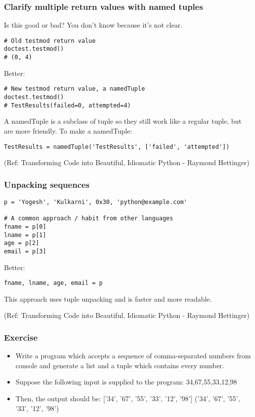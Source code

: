 \begin{frame}[fragile]\frametitle{Clarify multiple return values with named tuples}
Is this good or bad? You don't know because it's not clear.
\begin{lstlisting}
# Old testmod return value
doctest.testmod()
# (0, 4)
\end{lstlisting}
Better:
\begin{lstlisting}
# New testmod return value, a namedTuple
doctest.testmod()
# TestResults(failed=0, attempted=4)
\end{lstlisting}

A namedTuple is a subclass of tuple so they still work like a regular tuple, but are more friendly. To make a namedTuple:
\begin{lstlisting}
TestResults = namedTuple('TestResults', ['failed', 'attempted'])
\end{lstlisting}

\tiny{(Ref: Transforming Code into Beautiful, Idiomatic Python -  Raymond Hettinger)}

\end{frame}

\begin{frame}[fragile]\frametitle{Unpacking sequences}
\begin{lstlisting}
p = 'Yogesh', 'Kulkarni', 0x30, 'python@example.com'

# A common approach / habit from other languages
fname = p[0]
lname = p[1]
age = p[2]
email = p[3]
\end{lstlisting}
Better:
\begin{lstlisting}
fname, lname, age, email = p
\end{lstlisting}

This approach uses tuple unpacking and is faster and more readable.

\tiny{(Ref: Transforming Code into Beautiful, Idiomatic Python -  Raymond Hettinger)}

\end{frame}

\begin{frame}[fragile]\frametitle{Exercise}
\begin{itemize}
\item Write a program which accepts a sequence of comma-separated numbers from console and generate a list and a tuple which contains every number.
\item Suppose the following input is supplied to the program: 34,67,55,33,12,98
\item Then, the output should be: ['34', '67', '55', '33', '12', '98'] ('34', '67', '55', '33', '12', '98')
\end{itemize}
\end{frame}

